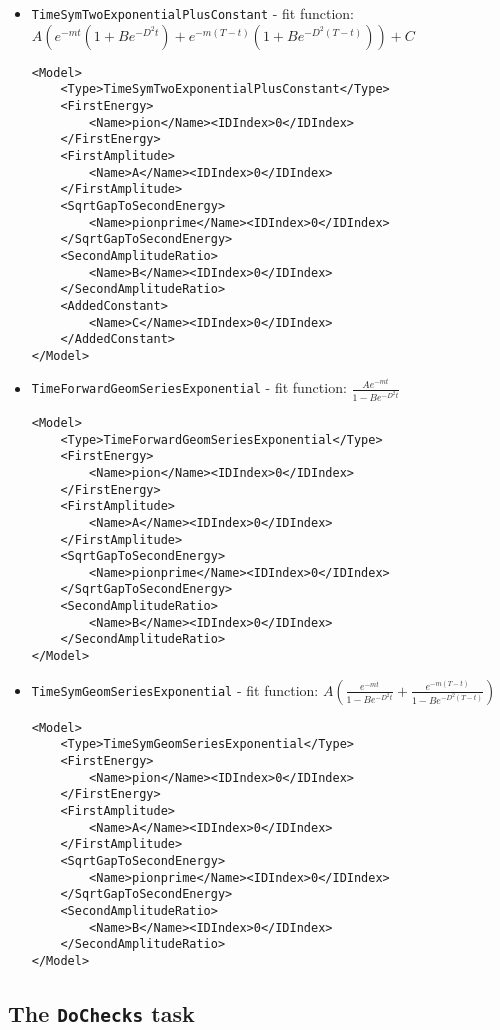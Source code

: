 \documentclass[12pt]{article}
\newcommand{\vb}{\texttt}
\begin{document}
\begin{itemize}
\item \vb{TimeSymTwoExponentialPlusConstant} - fit function:
  $A(e^{-mt}(1 + B e^{-D^2t} ) + e^{-m(T-t)}(1 + B e^{-D^2(T-t)})) + C$
\begin{verbatim}
<Model>
    <Type>TimeSymTwoExponentialPlusConstant</Type>
    <FirstEnergy>
        <Name>pion</Name><IDIndex>0</IDIndex>
    </FirstEnergy>
    <FirstAmplitude>
        <Name>A</Name><IDIndex>0</IDIndex>
    </FirstAmplitude>
    <SqrtGapToSecondEnergy>
        <Name>pionprime</Name><IDIndex>0</IDIndex>
    </SqrtGapToSecondEnergy>
    <SecondAmplitudeRatio>
        <Name>B</Name><IDIndex>0</IDIndex>
    </SecondAmplitudeRatio>
    <AddedConstant>
        <Name>C</Name><IDIndex>0</IDIndex>
    </AddedConstant>
</Model>
\end{verbatim}

\item \vb{TimeForwardGeomSeriesExponential} - fit function:
  $\frac{Ae^{-mt}}{1 - B e^{-D^2t}}$
\begin{verbatim}
<Model>
    <Type>TimeForwardGeomSeriesExponential</Type>
    <FirstEnergy>
        <Name>pion</Name><IDIndex>0</IDIndex>
    </FirstEnergy>
    <FirstAmplitude>
        <Name>A</Name><IDIndex>0</IDIndex>
    </FirstAmplitude>
    <SqrtGapToSecondEnergy>
        <Name>pionprime</Name><IDIndex>0</IDIndex>
    </SqrtGapToSecondEnergy>
    <SecondAmplitudeRatio>
        <Name>B</Name><IDIndex>0</IDIndex>
    </SecondAmplitudeRatio>
</Model>
\end{verbatim}

\item \vb{TimeSymGeomSeriesExponential} - fit function:
  $A\left(\frac{e^{-mt}}{1 - B e^{-D^2t}} + \frac{e^{-m(T-t)}}{1 - B e^{-D^2(T-t)}} \right)$
\begin{verbatim}
<Model>
    <Type>TimeSymGeomSeriesExponential</Type>
    <FirstEnergy>
        <Name>pion</Name><IDIndex>0</IDIndex>
    </FirstEnergy>
    <FirstAmplitude>
        <Name>A</Name><IDIndex>0</IDIndex>
    </FirstAmplitude>
    <SqrtGapToSecondEnergy>
        <Name>pionprime</Name><IDIndex>0</IDIndex>
    </SqrtGapToSecondEnergy>
    <SecondAmplitudeRatio>
        <Name>B</Name><IDIndex>0</IDIndex>
    </SecondAmplitudeRatio>
</Model>
\end{verbatim}
\end{itemize}

\subsection{The \vb{DoChecks} task}
\end{document}
